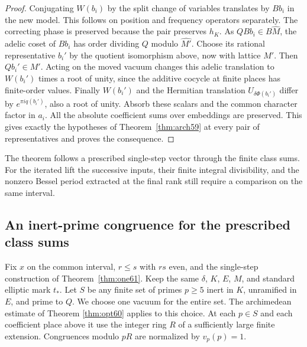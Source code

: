 \documentclass[a4paper,11pt]{article}
\theoremstyle{definition}
\theoremstyle{remark}
\numberwithin{equation}{section}
\begin{document}
\begin{proof}
Conjugating \(W(b_i)\) by the split change of variables translates
by \(B b_i\) in the new model. This follows on position and frequency
operators separately. The correcting phase is preserved because
the pair preserves \(h_K\). As \(Q B b_i\in B\widehat M\), the
adelic coset of \(B b_i\) has order dividing \(Q\) modulo
\(\widehat {M'}\). Choose its rational representative \(b_i'\)
by the quotient isomorphism above, now with lattice \(M'\).
Then \(Q b_i'\in M'\). Acting on the moved vacuum changes this
adelic translation to \(W(b_i')\) times a root of unity, since
the additive cocycle at finite places has finite-order values.
Finally \(W(b_i')\) and the Hermitian translation \(U_{\delta\Phi(b_i')}\)
differ by \(e^{\pi i q(b_i')}\), also a root of unity. Absorb
these scalars and the common character factor in \(a_i\). All
the absolute coefficient sums over embeddings are preserved.
This gives exactly the hypotheses of Theorem~\ref{thm:arch59}
at every pair of representatives and proves the consequence.
\end{proof}

The theorem follows a prescribed single-step vector through the
finite class sums. For the iterated lift the successive inputs,
their finite integral divisibility, and the nonzero Bessel period
extracted at the final rank still require a comparison on the
same interval.

\subsection{An inert-prime congruence for the prescribed class sums}\label{nav:V-14}
\label{sec:period63}

Fix \(x\) on the common interval, \(r\le s\) with \(rs\) even,
and the single-step construction of Theorem~\ref{thm:one61}.
Keep the same \(\delta\), \(K\), \(E\), \(M\), and standard
elliptic mark \(t_*\). Let \(S\) be any finite set of primes
\(p\ge5\) inert in \(K\), unramified in \(E\), and prime to \(Q\).
We choose one vacuum for the entire set. The archimedean estimate
of Theorem \ref{thm:opt60}
applies to this choice. At each \(p\in S\) and each coefficient
place above it use the integer ring \(R\) of a sufficiently large
finite extension. Congruences modulo \(pR\) are normalized by
\(v_p(p)=1\).
\end{document}

